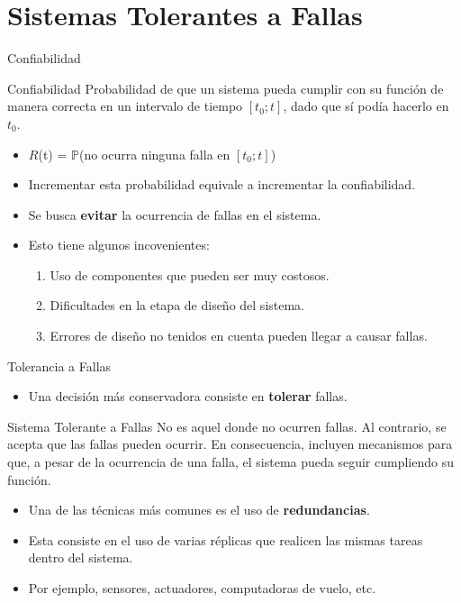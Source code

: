 \section{Sistemas Tolerantes a Fallas}

\begin{frame}{Confiabilidad}
	\begin{block}{Confiabilidad}
    	Probabilidad de que un sistema pueda cumplir con su función de manera correcta en un intervalo de tiempo $\left[t_0;t\right]$, dado que sí podía hacerlo en $t_0$.
    \end{block}
    \begin{itemize}
    	\item $R$(t) = $\mathbb{P}$(no ocurra ninguna falla en $[t_0;t]$)
    	\item Incrementar esta probabilidad equivale a incrementar la confiabilidad.
    	\item Se busca \textbf{evitar} la ocurrencia de fallas en el sistema.
    	\item Esto tiene algunos incovenientes:
    	\begin{enumerate}
    		\item Uso de componentes que pueden ser muy costosos.
    		\item Dificultades en la etapa de diseño del sistema.
    		\item Errores de diseño no tenidos en cuenta pueden llegar a causar fallas.
    	\end{enumerate}
	\end{itemize}
\end{frame}

\begin{frame}{Tolerancia a Fallas}
	\begin{itemize}
		\item Una decisión más conservadora consiste en \textbf{tolerar} fallas.
	\end{itemize}
	\begin{block}{Sistema Tolerante a Fallas}
    	No es aquel donde no ocurren fallas. Al contrario, se acepta que las fallas pueden ocurrir. En consecuencia, incluyen mecanismos para que, a pesar de la ocurrencia de una falla, el sistema pueda seguir cumpliendo su función.
    \end{block}
    \begin{itemize}
    	\item Una de las técnicas más comunes es el uso de \textbf{redundancias}.
    	\item Esta consiste en el uso de varias réplicas que realicen las mismas tareas dentro del sistema.
    	\item Por ejemplo, sensores, actuadores, computadoras de vuelo, etc.
    \end{itemize}
\end{frame}

